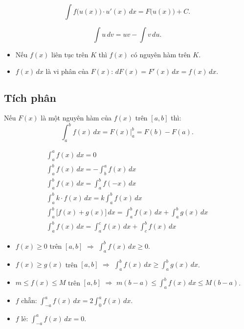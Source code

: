 \documentclass[12pt,a4paper]{article}
\begin{document}
\begin{congthuc}[title={Nguyên hàm hàm hợp}]
  \[
    \int f\bigl(u(x)\bigr) \cdot u'(x)\,dx = F\bigl(u(x)\bigr) + C.
  \]
\end{congthuc}

\begin{congthuc}[title={Nguyên hàm từng phần}]
  \[
    \int u\,dv = uv - \int v\,du.
  \]
\end{congthuc}

\begin{luuy}
  \begin{itemize}
    \item Nếu $f(x)$ liên tục trên $K$ thì $f(x)$ có nguyên hàm trên $K$.
    \item $f(x)\,dx$ là vi phân của $F(x)$: $dF(x) = F'(x)\,dx = f(x)\,dx$.
  \end{itemize}
\end{luuy}

\subsection{Tích phân}

\begin{dinhnghia}
  Nếu $F(x)$ là một nguyên hàm của $f(x)$ trên $[a,b]$ thì:
  \[
    \int_a^b f(x)\,dx = F(x)\bigr|_a^b = F(b) - F(a).
  \]
\end{dinhnghia}

\begin{tinhchat}
  \begin{gather*}
    \int_a^a f(x)\,dx = 0 \\[4pt]
    \int_a^b f(x)\,dx = -\int_b^a f(x)\,dx \\[4pt]
    \int_a^b f(x)\,dx = \int_a^b f(-x)\,dx \\[4pt]
    \int_a^b k \cdot f(x)\,dx = k \int_a^b f(x)\,dx \\[4pt]
    \int_a^b \bigl[f(x) + g(x)\bigr]\,dx = \int_a^b f(x)\,dx + \int_a^b g(x)\,dx \\[4pt]
    \int_a^b f(x)\,dx = \int_a^c f(x)\,dx + \int_c^b f(x)\,dx
  \end{gather*}
  \begin{itemize}
    \item $f(x) \ge 0$ trên $[a,b]$ $\Rightarrow$ $\displaystyle\int_a^b f(x)\,dx \ge 0$.
    \item $f(x) \ge g(x)$ trên $[a,b]$ $\Rightarrow$ $\displaystyle\int_a^b f(x)\,dx \ge \int_a^b g(x)\,dx$.
    \item $m \le f(x) \le M$ trên $[a,b]$ $\Rightarrow$ $m(b-a) \le \displaystyle\int_a^b f(x)\,dx \le M(b-a)$.
    \item $f$ chẵn: $\displaystyle\int_{-a}^{a} f(x)\,dx = 2\int_0^a f(x)\,dx$.
    \item $f$ lẻ: $\displaystyle\int_{-a}^{a} f(x)\,dx = 0$.
  \end{itemize}
\end{tinhchat}
\end{document}
